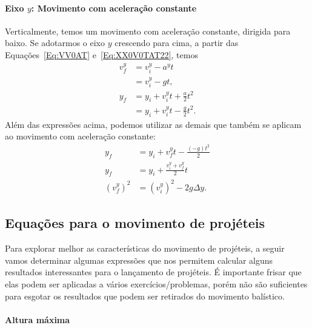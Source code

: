 \paragraph{Eixo $y$: Movimento com aceleração constante}

Verticalmente, temos um movimento com aceleração constante, dirigida para baixo. Se adotarmos o eixo $y$ crescendo para cima, a partir das Equações~\eqref{Eq:VV0AT} e~\eqref{Eq:XX0V0TAT22}, temos
\begin{align}
  v_{f}^y &= v_{i}^y - a^y t \\
  &= v_{i}^y - g t, \\
  y_f &= y_i + v_{i}^y t + \frac{a}{2}t^2 \\
  &= y_i + v_{i}^y t - \frac{g}{2}t^2. \label{Eq:PosYProj}
\end{align}
%
Além das expressões acima, podemos utilizar as demais que também se aplicam ao movimento com aceleração constante:
\begin{align}
	y_f &= y_i + v_f^y t - \frac{(-g)t^2}{2} \\
	y_f &= y_i + \frac{v_i^y + v_f^y}{2} t \\
	(v_f^y)^2 &= (v_i^y)^2 - 2 g \Delta y. \label{Eq:TorricelliMovProj}
\end{align}

\subsection{Equações para o movimento de projéteis}

Para explorar melhor as características do movimento de projéteis, a seguir vamos determinar algumas expressões que nos permitem calcular alguns resultados interessantes para o lançamento de projéteis. É importante frisar que elas podem ser aplicadas a vários exercícios/problemas, porém não são suficientes para esgotar os resultados que podem ser retirados do movimento balístico.

\paragraph{Altura máxima}


